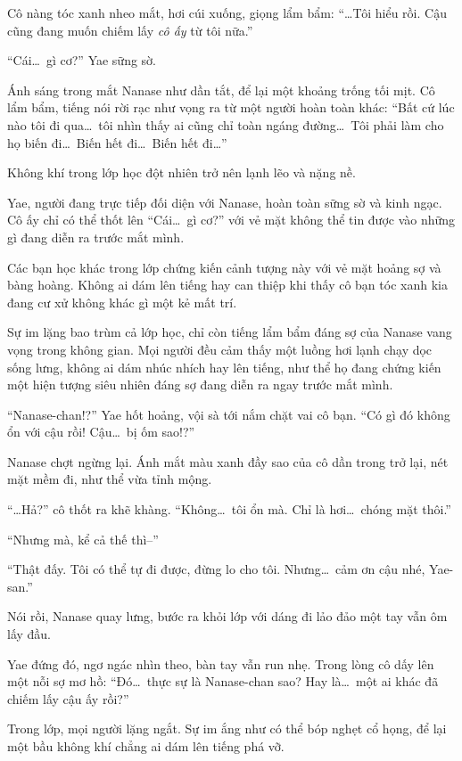 \documentclass[../main.tex]{subfiles}
\begin{document}
Cô nàng tóc xanh nheo mắt, hơi cúi xuống, giọng lẩm bẩm: ``\dots Tôi hiểu rồi. Cậu cũng đang muốn chiếm lấy \emph{cô ấy} từ tôi nữa.''

``Cái\dots\ gì cơ?'' Yae sững sờ.

Ánh sáng trong mắt Nanase như dần tắt, để lại một khoảng trống tối mịt. Cô lẩm bẩm, tiếng nói rời rạc như vọng ra từ một người hoàn toàn khác: ``Bất cứ lúc nào tôi đi qua\dots\ tôi nhìn thấy ai cũng chỉ toàn ngáng đường\dots\ Tôi phải làm cho họ biến đi\dots\ Biến hết đi\dots\ Biến hết đi\dots''

Không khí trong lớp học đột nhiên trở nên lạnh lẽo và nặng nề.

Yae, người đang trực tiếp đối diện với Nanase, hoàn toàn sững sờ và kinh ngạc. Cô ấy chỉ có thể thốt lên ``Cái\dots\ gì cơ?'' với vẻ mặt không thể tin được vào những gì đang diễn ra trước mắt mình.

Các bạn học khác trong lớp chứng kiến cảnh tượng này với vẻ mặt hoảng sợ và bàng hoàng. Không ai dám lên tiếng hay can thiệp khi thấy cô bạn tóc xanh kia đang cư xử không khác gì một kẻ mất trí.

Sự im lặng bao trùm cả lớp học, chỉ còn tiếng lẩm bẩm đáng sợ của Nanase vang vọng trong không gian. Mọi người đều cảm thấy một luồng hơi lạnh chạy dọc sống lưng, không ai dám nhúc nhích hay lên tiếng, như thể họ đang chứng kiến một hiện tượng siêu nhiên đáng sợ đang diễn ra ngay trước mắt mình.

``Nanase-chan!?'' Yae hốt hoảng, vội sà tới nắm chặt vai cô bạn. ``Có gì đó không ổn với cậu rồi! Cậu\dots\ bị ốm sao!?''

Nanase chợt ngừng lại. Ánh mắt màu xanh đầy sao của cô dần trong trở lại, nét mặt mềm đi, như thể vừa tỉnh mộng.

``\dots Hả?'' cô thốt ra khẽ khàng. ``Không\dots\ tôi ổn mà. Chỉ là hơi\dots\ chóng mặt thôi.''

``Nhưng mà, kể cả thế thì--''

``Thật đấy. Tôi có thể tự đi được, đừng lo cho tôi. Nhưng\dots\ cảm ơn cậu nhé, Yae-san.''

Nói rồi, Nanase quay lưng, bước ra khỏi lớp với dáng đi lảo đảo một tay vẫn ôm lấy đầu.

Yae đứng đó, ngơ ngác nhìn theo, bàn tay vẫn run nhẹ. Trong lòng cô dấy lên một nỗi sợ mơ hồ: ``Đó\dots\ thực sự là Nanase-chan sao? Hay là\dots\ một ai khác đã chiếm lấy cậu ấy rồi?''

Trong lớp, mọi người lặng ngắt. Sự im ắng như có thể bóp nghẹt cổ họng, để lại một bầu không khí chẳng ai dám lên tiếng phá vỡ.
\end{document}
